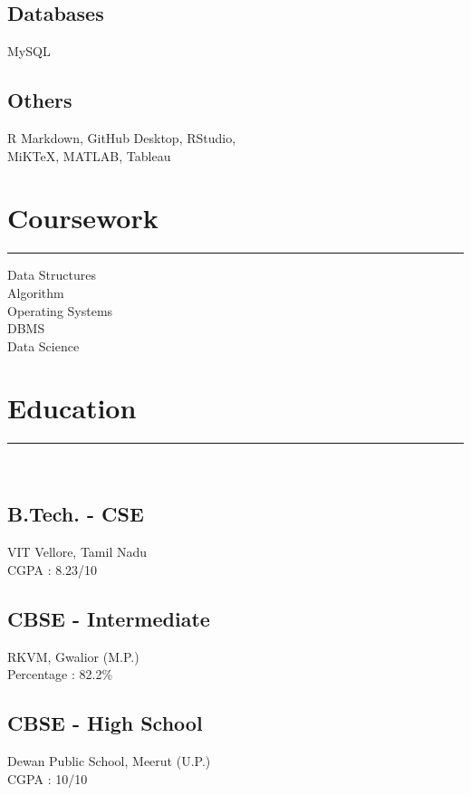 \documentclass[]{meetresume-class}
\begin{document}
\begin{minipage}[t]{0.33\textwidth}
		\subsection{Databases}
		MySQL%
		\vspace{6pt}
		
		\subsection{Others}
		R Markdown, GitHub Desktop, RStudio,\\
		MiKTeX, MATLAB, Tableau
		\sectionsep
		\section{Coursework}
		\noindent\rule{5cm}{0.6pt}
		
		Data Structures\\
		Algorithm\\
		Operating Systems\\
		DBMS\\
		Data Science
		\sectionsep
		\section{Education} 
		\noindent\rule{5cm}{0.6pt}\\
		\subsection{B.Tech. - CSE}
		VIT Vellore, Tamil Nadu \\
		CGPA : 8.23/10\\
		\vspace{8pt}
		\subsection{CBSE - Intermediate}
		RKVM, Gwalior (M.P.)\\
		Percentage : 82.2\%\\
		\vspace{8pt}
		\subsection{CBSE - High School}
		Dewan Public School, Meerut (U.P.)\\
		CGPA : 10/10
		\sectionsep

\end{minipage}
\end{document}
